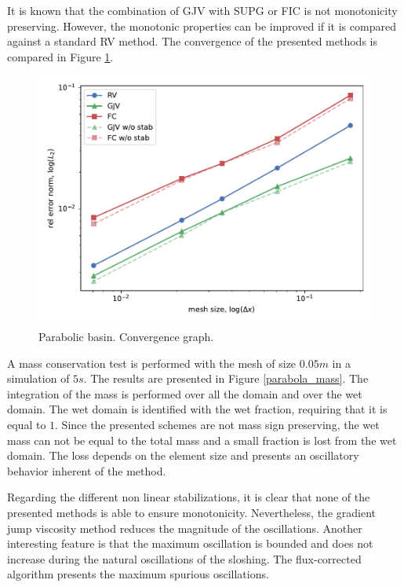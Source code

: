 It is known that the combination of GJV with SUPG or FIC is not monotonicity preserving. However, the monotonic properties can be improved if it is compared against a standard RV method. The convergence of the presented methods is compared in Figure \ref{parabola_convergence}.



\begin{figure} [htp]
    \centering
    \includegraphics[width=.8\textwidth]{img/eulerian/par/conv_1.pdf}
    \caption{Parabolic basin. Convergence graph.}
    \label{parabola_convergence}   
\end{figure}



A mass conservation test is performed with the mesh of size $0.05m$ in a simulation of $5s$. The results are presented in Figure \ref{parabola_mass}. The integration of the mass is performed over all the domain and over the wet domain. The wet domain is identified with the wet fraction, requiring that it is equal to $1$. Since the presented schemes are not mass sign preserving, the wet mass can not be equal to the total mass and a small fraction is lost from the wet domain. The loss depends on the element size and presents an oscillatory behavior inherent of the method.

Regarding the different non linear stabilizations, it is clear that none of the presented methods is able to ensure monotonicity. Nevertheless, the gradient jump viscosity method reduces the magnitude of the oscillations. Another interesting feature is that the maximum oscillation is bounded and does not increase during the natural oscillations of the sloshing. The flux-corrected algorithm presents the maximum spurious oscillations.


